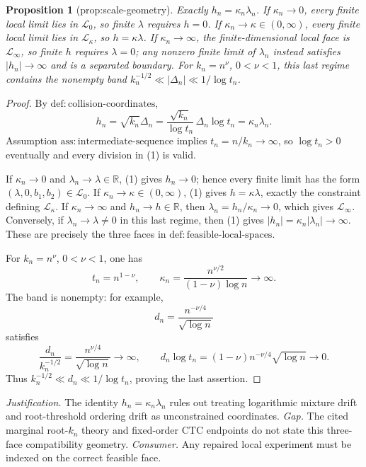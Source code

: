 \documentclass{article}
\newtheorem{proposition}{Proposition}
\begin{document}
\begin{proposition}[prop:scale-geometry]\label{prop:scale-geometry}
Exactly \(h_n=\kappa_n\lambda_n\). If \(\kappa_n\to0\), every finite local limit lies in \(\mathcal L_0\), so finite \(\lambda\) requires \(h=0\). If \(\kappa_n\to\kappa\in(0,\infty)\), every finite local limit lies in \(\mathcal L_\kappa\), so \(h=\kappa\lambda\). If \(\kappa_n\to\infty\), the finite-dimensional local face is \(\mathcal L_\infty\), so finite \(h\) requires \(\lambda=0\); any nonzero finite limit of \(\lambda_n\) instead satisfies \( |h_n|\to\infty\) and is a separated boundary. For \(k_n=n^\nu\), \(0<\nu<1\), this last regime contains the nonempty band \(k_n^{-1/2}\ll|\Delta_n|\ll1/\log t_n\).
\end{proposition}
\begin{proof}
By \(\mathrm{def{:}collision\text{-}coordinates}\),
\[
 h_n=\sqrt{k_n}\Delta_n
 =\frac{\sqrt{k_n}}{\log t_n}\,\Delta_n\log t_n
 =\kappa_n\lambda_n. \tag{1}
\]
Assumption \(\mathrm{ass{:}intermediate\text{-}sequence}\) implies \(t_n=n/k_n\to\infty\), so \(\log t_n>0\) eventually and every division in (1) is valid.

If \(\kappa_n\to0\) and \(\lambda_n\to\lambda\in\mathbb R\), (1) gives \(h_n\to0\); hence every finite limit has the form \((\lambda,0,b_1,b_2)\in\mathcal L_0\).  If \(\kappa_n\to\kappa\in(0,\infty)\), (1) gives \(h=\kappa\lambda\), exactly the constraint defining \(\mathcal L_\kappa\).  If \(\kappa_n\to\infty\) and \(h_n\to h\in\mathbb R\), then \(\lambda_n=h_n/\kappa_n\to0\), which gives \(\mathcal L_\infty\).  Conversely, if \(\lambda_n\to\lambda\neq0\) in this last regime, then (1) gives \(|h_n|=\kappa_n|\lambda_n|\to\infty\).  These are precisely the three faces in \(\mathrm{def{:}feasible\text{-}local\text{-}spaces}\).

For \(k_n=n^\nu\), \(0<\nu<1\), one has
\[
 t_n=n^{1-\nu},\qquad
 \kappa_n=\frac{n^{\nu/2}}{(1-\nu)\log n}\longrightarrow\infty.
\]
The band is nonempty: for example,
\[
 d_n=\frac{n^{-\nu/4}}{\sqrt{\log n}}
\]
satisfies
\[
 \frac{d_n}{k_n^{-1/2}}
 =\frac{n^{\nu/4}}{\sqrt{\log n}}\longrightarrow\infty,
 \qquad
 d_n\log t_n
 =(1-\nu)n^{-\nu/4}\sqrt{\log n}\longrightarrow0.
\]
Thus \(k_n^{-1/2}\ll d_n\ll1/\log t_n\), proving the last assertion.
\end{proof}
\par\smallskip\noindent \textit{Justification.} The identity \(h_n=\kappa_n\lambda_n\) rules out treating logarithmic mixture drift and root-threshold ordering drift as unconstrained coordinates. \textit{Gap.} The cited marginal root-\(k_n\) theory and fixed-order CTC endpoints do not state this three-face compatibility geometry. \textit{Consumer.} Any repaired local experiment must be indexed on the correct feasible face.
\end{document}
